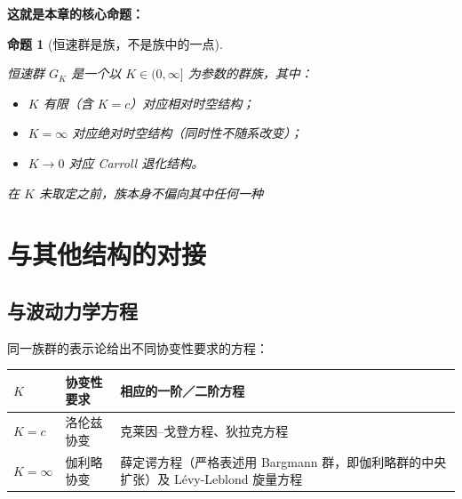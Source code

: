 \documentclass[
  chinese,
  a4paper,
  UTF8,
  12pt,
  oneside,
  openany]{ctexbook}
\newcounter{none} %
\providecommand{\tightlist}{%
  \setlength{\itemsep}{0pt}\setlength{\parskip}{0pt}}
\theoremstyle{plain}
\theoremstyle{plain}
\theoremstyle{plain}
\newtheorem{proposition}{命题}[chapter]
\theoremstyle{definition}
\theoremstyle{plain}
\theoremstyle{plain}
\theoremstyle{remark}
\begin{document}
\textbf{这就是本章的核心命题：}

\begin{proposition}[恒速群是族，不是族中的一点]\protect\hypertarget{prp-isg-superposition}{}\label{prp-isg-superposition}

恒速群 \(G_K\) 是一个以 \(K\in(0,\infty]\) 为参数的群族，其中：

\begin{itemize}
\tightlist
\item
  \(K\) 有限（含 \(K=c\)）对应相对时空结构；
\item
  \(K=\infty\) 对应绝对时空结构（同时性不随系改变）；
\item
  \(K\to0\) 对应 Carroll 退化结构。
\end{itemize}

在 \(K\) 未取定之前，族本身不偏向其中任何一种

\end{proposition}

\section{与其他结构的对接}\label{sec-isg-others}

\subsection{与波动力学方程}\label{ux4e0eux6ce2ux52a8ux529bux5b66ux65b9ux7a0b}

同一族群的表示论给出不同协变性要求的方程：

{\def\LTcaptype{none} %
\begin{longtable}[]{@{}
  >{\raggedright\arraybackslash}p{}
  >{\raggedright\arraybackslash}p{}
  >{\raggedright\arraybackslash}p{}@{}}
\toprule\noalign{}
\begin{minipage}[b]{\linewidth}\raggedright
\(K\)
\end{minipage} & \begin{minipage}[b]{\linewidth}\raggedright
协变性要求
\end{minipage} & \begin{minipage}[b]{\linewidth}\raggedright
相应的一阶／二阶方程
\end{minipage} \\
\midrule\noalign{}
\endhead
\bottomrule\noalign{}
\endlastfoot
\(K=c\) & 洛伦兹协变 & 克莱因--戈登方程、狄拉克方程 \\
\(K=\infty\) & 伽利略协变 & 薛定谔方程（严格表述用 Bargmann
群，即伽利略群的中央扩张）及 Lévy-Leblond 旋量方程 \\
\end{longtable}
}
\end{document}
